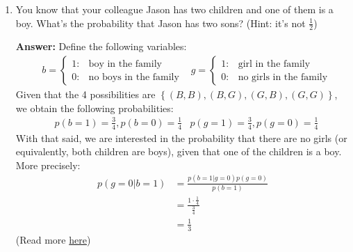 \documentclass{article}
\newenvironment{QandA}{\begin{enumerate}[label=\arabic*.]}{\end{enumerate}}
\newenvironment{answer}{\par\normalfont \textbf{Answer:}}{}
\newcommand{\g}{\vert}
\begin{document}
\begin{QandA}
    \item You know that your colleague Jason has two children and one of them is a boy. What’s the probability that Jason has two sons? (Hint: it’s not $\frac{1}{2}$)
    \begin{answer}
        Define the following variables:
        \begin{align*}
            &b = \begin{cases}
                1: &\text{boy in the family} \\
                0: &\text{no boys in the family}
            \end{cases}
            &g = \begin{cases}
                1: &\text{girl in the family} \\
                0: &\text{no girls in the family}
            \end{cases}
        \end{align*}
        Given that the 4 possibilities are $\left\{ (B, B), (B, G), (G, B), (G, G) \right\}$, we obtain the following probabilities:
        \begin{align*}
            &p(b=1) = \frac{3}{4}, p(b=0) = \frac{1}{4} &p(g=1) = \frac{3}{4}, p(g=0) = \frac{1}{4}
        \end{align*}
        With that said, we are interested in the probability that there are no girls (or equivalently, both children are boys), given that one of the children is a boy. More precisely:
        \begin{align*}
            p(g=0 \g b = 1) &= \frac{p(b=1 \g g = 0) p(g=0)}{p(b=1)} \\
            &= \frac{1 \cdot \frac{1}{4}}{\frac{3}{4}} \\
            &= \frac{1}{3}
        \end{align*}
        (Read more \href{https://en.wikipedia.org/wiki/Boy_or_Girl_paradox}{here})
    \end{answer}
    

\end{QandA}
\end{document}
